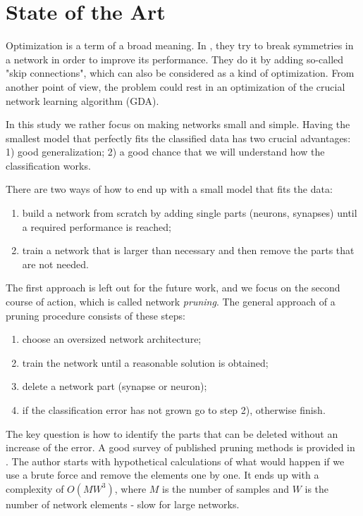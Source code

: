 \newpage
\section{State of the Art} \label{sec:state_of_the_art}
Optimization is a term of a broad meaning. In \citep{orhan:symmetry}, they try to break symmetries in a network in order to improve its performance. They do it by adding so-called "skip connections", which can also be considered as a kind of optimization. From another point of view, the problem could rest in an optimization of the crucial network learning algorithm (GDA).

In this study we rather focus on making networks small and simple. Having the smallest model that perfectly fits the classified data has two crucial advantages: 1) good generalization; 2) a good chance that we will understand how the classification works.

There are two ways of how to end up with a small model that fits the data:

\begin{enumerate}
\item build a network from scratch by adding single parts (neurons, synapses) until a required performance is reached;
\item train a network that is larger than necessary and then remove the parts that are not needed.
\end{enumerate}

The first approach is left out for the future work, and we focus on the second course of action, which is called network \textit{pruning}. The general approach of a pruning procedure consists of these steps:

\begin{enumerate}
\item choose an oversized network architecture;
\item train the network until a reasonable solution is obtained;
\item delete a network part (synapse or neuron);
\item if the classification error has not grown go to step 2), otherwise finish.
\end{enumerate}

The key question is how to identify the parts that can be deleted without an increase of the error. A good survey of published pruning methods is provided in \citep{reed:pa_survey}. The author starts with hypothetical calculations of what would happen if we use a brute force and remove the elements one by one. It ends up with a complexity of $ O(MW^3) $, where $ M $ is the number of samples and $ W $ is the number of network elements - slow for large networks. 

